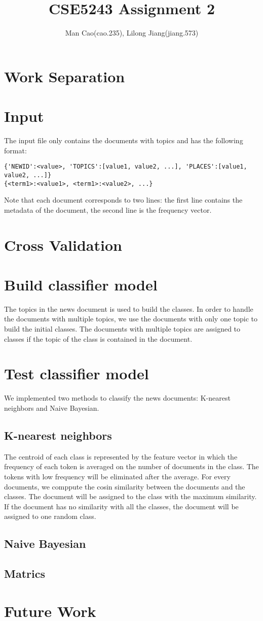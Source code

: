 \documentclass{article}
\begin{document}
\title{CSE5243 Assignment 2}
\author{Man Cao(cao.235), Lilong Jiang(jiang.573)}
\maketitle

\section{Work Separation}

\section{Input}
The input file only contains the documents with topics and has the following format:
\begin{verbatim}
{'NEWID':<value>, 'TOPICS':[value1, value2, ...], 'PLACES':[value1, value2, ...]}
{<term1>:<value1>, <term1>:<value2>, ...}
\end{verbatim}
Note that each document corresponds to two lines: the first line contains the
metadata of the document, the second line is the frequency vector.

\section{Cross Validation}


\section{Build classifier model}
The topics in the news document is used to build the classes. In order to handle the documents with multiple topics, we use the documents with only one topic to build the initial classes. The documents with multiple topics are assigned to classes if the topic of the class is contained in the document. 

\section{Test classifier model}
We implemented two methods to classify the news documents: K-nearest neighbors and Naive Bayesian. 

\subsection{K-nearest neighbors}
The centroid of each class is represented by the feature vector in which the frequency of each token is averaged on the number of documents in the class. The tokens with low frequency will be eliminated after the average. For every documents, we comppute the cosin similarity between the documents and the classes. The document will be assigned to the class with the maximum similarity. If the document has no similarity with all the classes, the document will be assigned to one random class.

\subsection{Naive Bayesian}

\subsection{Matrics}


\section{Future Work}
\end{document}
